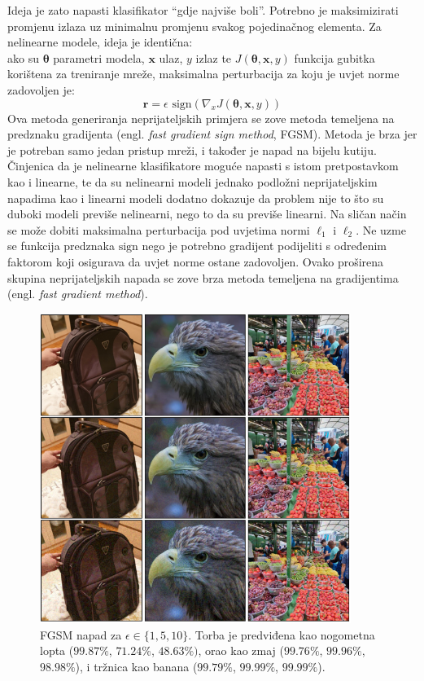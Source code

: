 \documentclass[utf8, diplomski]{fer}
\begin{document}
\par
Ideja je zato napasti klasifikator ``gdje najviše boli''. Potrebno je maksimizirati promjenu izlaza uz minimalnu promjenu svakog pojedinačnog elementa. Za nelinearne modele, ideja je identična: \\
ako su $\boldsymbol{\theta}$ parametri modela, $\boldsymbol{x}$ ulaz, $y$ izlaz te $J(\boldsymbol{\theta}, \boldsymbol{x}, y)$ funkcija gubitka korištena za treniranje mreže, maksimalna perturbacija za koju je uvjet norme zadovoljen je:
\begin{equation}
	\boldsymbol{r} = \epsilon \text{ sign}(\nabla_{x}J(\boldsymbol{\theta}, \boldsymbol{x}, y))
\end{equation}
Ova metoda generiranja neprijateljskih primjera se zove metoda temeljena na predznaku gradijenta (engl. \textit{fast gradient sign method}, FGSM). Metoda je brza jer je potreban samo jedan pristup mreži, i također je napad na bijelu kutiju.
Činjenica da je nelinearne klasifikatore moguće napasti s istom pretpostavkom kao i linearne, te da su nelinearni modeli jednako podložni neprijateljskim napadima kao i linearni modeli dodatno dokazuje da problem nije to što su duboki modeli previše nelinearni, nego to da su previše linearni. Na sličan način se može dobiti maksimalna perturbacija pod uvjetima normi $\ell_{1}$ i $\ell_{2}$. Ne uzme se funkcija predznaka $\text{sign}$ nego je potrebno gradijent podijeliti s određenim faktorom koji osigurava da uvjet norme ostane zadovoljen. Ovako proširena skupina neprijateljskih napada se zove brza metoda temeljena na gradijentima (engl. \textit{fast gradient method}). \\
\begin{figure}[H]
\centering
\includegraphics[width=0.9\textwidth,keepaspectratio]{img/results/fgm_inf_1510.png}
\caption{FGSM napad za $\epsilon \in \{1, 5, 10\}$. Torba je predviđena kao nogometna lopta ($99.87\%$, $71.24\%$, $48.63\%)$, orao kao zmaj ($99.76\%$, $99.96\%$, $98.98\%$), i tržnica kao banana ($99.79\%$, $99.99\%$, $99.99\%$).}
\end{figure}\label{fgsm_ex}
\end{document}

